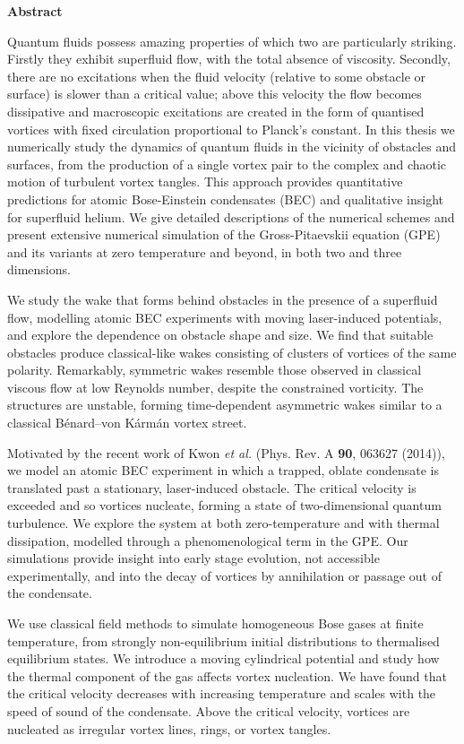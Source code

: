 \begin{center}
{\bf Abstract}
\end{center}
\noindent
Quantum fluids possess amazing properties of which two are particularly striking. Firstly they exhibit superfluid flow, with the total absence of viscosity. Secondly, there are no excitations when the fluid velocity (relative to some obstacle or surface) is slower than a critical value; above this velocity the flow becomes dissipative and macroscopic excitations are created in the form of quantised vortices with fixed circulation proportional to Planck's constant. In this thesis we numerically study the dynamics of quantum fluids in the vicinity of obstacles and surfaces, from the production of a single vortex pair to the complex and chaotic motion of turbulent vortex tangles. This approach provides quantitative predictions for atomic Bose-Einstein condensates (BEC) and qualitative insight for superfluid helium. We give detailed descriptions of the numerical schemes and present extensive numerical simulation of the Gross-Pitaevskii equation (GPE) and its variants at zero temperature and beyond, in both two and three dimensions.

We study the wake that forms behind obstacles in the presence of a superfluid flow, modelling atomic BEC experiments with moving laser-induced potentials, and explore the dependence on obstacle shape and size. We find that suitable obstacles produce classical-like wakes consisting of clusters of vortices of the same polarity. Remarkably, symmetric wakes resemble those observed in classical viscous flow at low Reynolds number, despite the constrained vorticity.  The structures are unstable, forming time-dependent asymmetric wakes similar to a classical B\'enard--von K\'arm\'an vortex street.

Motivated by the recent work of Kwon {\it et al.} (Phys. Rev. A {\bf 90}, 063627
(2014)), we model an atomic BEC experiment in which a trapped, oblate condensate is translated past a stationary, laser-induced obstacle. The critical velocity is exceeded and so vortices nucleate, forming a state of two-dimensional quantum turbulence. We explore the system at both zero-temperature and with thermal dissipation, modelled through a phenomenological term in the GPE. Our simulations provide insight into early stage evolution, not accessible experimentally, and into the decay of vortices by annihilation or passage out of the condensate.

We use classical field methods to simulate homogeneous Bose gases at finite temperature, from strongly non-equilibrium initial distributions to thermalised equilibrium states. We introduce a moving cylindrical potential and study how the thermal component of the gas affects vortex nucleation. We have found that the critical velocity decreases with increasing temperature and scales with the speed of sound of the condensate. Above the critical velocity, vortices are nucleated as irregular vortex lines, rings, or vortex tangles.

